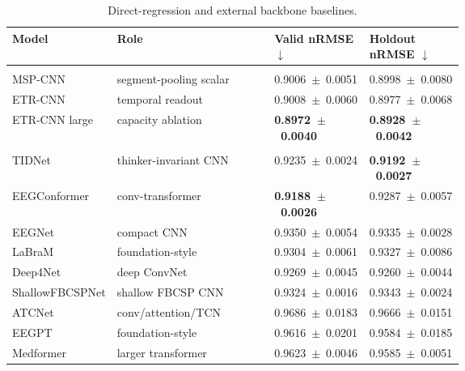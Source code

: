 \documentclass[12pt]{article}
\begin{document}
\begin{table}[!t]
\centering
\caption{Direct-regression and external backbone baselines.}
\label{tab:r11_regression_baselines}
\footnotesize
\setlength{\tabcolsep}{2pt}
\renewcommand{\arraystretch}{1.15}
\begin{tabularx}{\linewidth}{@{} >{\RaggedRight\arraybackslash}p{0.22\linewidth} Y >{\centering\arraybackslash}p{0.215\linewidth} >{\centering\arraybackslash}p{0.215\linewidth} @{}}
\toprule
\textbf{Model} & \textbf{Role} & \textbf{Valid nRMSE} $\downarrow$ & \textbf{Holdout nRMSE} $\downarrow$ \\
\midrule
{} \\
\addlinespace[0.15em]
MSP-CNN & segment-pooling scalar & \mbox{0.9006 $\pm$ 0.0051} & \mbox{0.8998 $\pm$ 0.0080} \\
ETR-CNN & temporal readout & \mbox{0.9008 $\pm$ 0.0060} & \mbox{0.8977 $\pm$ 0.0068} \\
ETR-CNN large & capacity ablation & \textbf{\mbox{0.8972 $\pm$ 0.0040}} & \textbf{\mbox{0.8928 $\pm$ 0.0042}} \\
\midrule
{} \\
\addlinespace[0.15em]
TIDNet & thinker-invariant CNN & \mbox{0.9235 $\pm$ 0.0024} & \textbf{\mbox{0.9192 $\pm$ 0.0027}} \\
EEGConformer & conv-transformer & \textbf{\mbox{0.9188 $\pm$ 0.0026}} & \mbox{0.9287 $\pm$ 0.0057} \\
EEGNet & compact CNN & \mbox{0.9350 $\pm$ 0.0054} & \mbox{0.9335 $\pm$ 0.0028} \\
LaBraM & foundation-style & \mbox{0.9304 $\pm$ 0.0061} & \mbox{0.9327 $\pm$ 0.0086} \\
Deep4Net & deep ConvNet & \mbox{0.9269 $\pm$ 0.0045} & \mbox{0.9260 $\pm$ 0.0044} \\
ShallowFBCSPNet & shallow FBCSP CNN & \mbox{0.9324 $\pm$ 0.0016} & \mbox{0.9343 $\pm$ 0.0024} \\
ATCNet & conv/attention/TCN & \mbox{0.9686 $\pm$ 0.0183} & \mbox{0.9666 $\pm$ 0.0151} \\
EEGPT & foundation-style & \mbox{0.9616 $\pm$ 0.0201} & \mbox{0.9584 $\pm$ 0.0185} \\
Medformer & larger transformer & \mbox{0.9623 $\pm$ 0.0046} & \mbox{0.9585 $\pm$ 0.0051} \\
\bottomrule
\end{tabularx}
\end{table}
\end{document}
